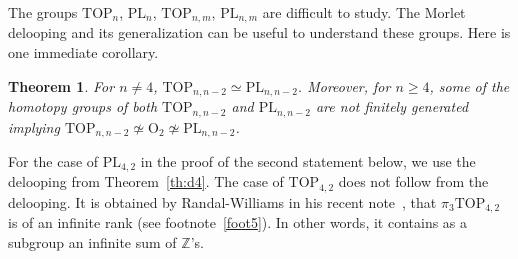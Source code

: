 \documentclass[11pt]{amsart}
\newtheorem{theorem}{Theorem}[section]
\theoremstyle{definition}
\newcommand{\Z}{{\mathbb Z}}
\newcommand{\PL}{\mathrm{PL}}
\newcommand{\TOP}{\mathrm{TOP}}
\newcommand{\OO}{\mathrm{O}}
\numberwithin{equation}{section}
\begin{document}
The groups  $\TOP_n$, $\PL_n$, $\TOP_{n,m}$, $\PL_{n,m}$ are difficult to study. The Morlet delooping and its generalization can be useful to understand these groups. Here is one immediate corollary.

\begin{theorem}\label{th:top_cod2}
For $n\neq 4$,  $\TOP_{n,n-2}\simeq\PL_{n,n-2}$. Moreover, for $n\geq 4$, some of the homotopy groups of both $\TOP_{n,n-2}$ and $\PL_{n,n-2}$ are not finitely generated implying  $\TOP_{n,n-2}\not\simeq\OO_2 \not\simeq \PL_{n,n-2}$.
\end{theorem}

 For the case  of $\PL_{4,2}$ in the proof of the second statement
below, we use the delooping from Theorem~\ref{th:d4}. The case of $\TOP_{4,2}$  does not follow from the delooping. It is  obtained by Randal-Williams in his recent note~\cite{Randal_S2_S4}, that $\pi_3 \TOP_{4,2}$ is of an infinite rank (see  footnote~\ref{foot5}). In other words, it contains as a subgroup an infinite sum of $\Z$'s.
\end{document}
